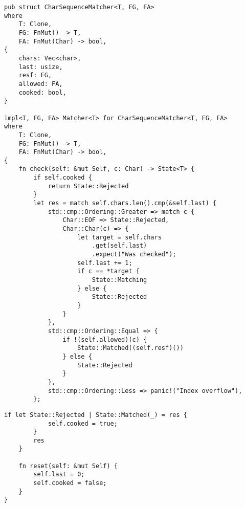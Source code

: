 \begin{lstlisting}[caption={Разбор заготовленной последовательности байт (часть 1)}, label={lst:rust_lexer_char_seq1}]
pub struct CharSequenceMatcher<T, FG, FA>
where
    T: Clone,
    FG: FnMut() -> T,
    FA: FnMut(Char) -> bool,
{
    chars: Vec<char>,
    last: usize,
    resf: FG,
    allowed: FA,
    cooked: bool,
}

impl<T, FG, FA> Matcher<T> for CharSequenceMatcher<T, FG, FA>
where
    T: Clone,
    FG: FnMut() -> T,
    FA: FnMut(Char) -> bool,
{
    fn check(self: &mut Self, c: Char) -> State<T> {
        if self.cooked {
            return State::Rejected
        }
        let res = match self.chars.len().cmp(&self.last) {
            std::cmp::Ordering::Greater => match c {
                Char::EOF => State::Rejected,
                Char::Char(c) => {
                    let target = self.chars
                        .get(self.last)
                        .expect("Was checked");
                    self.last += 1;
                    if c == *target {
                        State::Matching
                    } else {
                        State::Rejected
                    }
                }
            },
            std::cmp::Ordering::Equal => {
                if !(self.allowed)(c) {
                    State::Matched((self.resf)())
                } else {
                    State::Rejected
                }
            },
            std::cmp::Ordering::Less => panic!("Index overflow"),
        };
\end{lstlisting}
\clearpage
\begin{lstlisting}[caption={Разбор заготовленной последовательности байт (часть 2)}, label={lst:rust_lexer_char_seq2}]
        if let State::Rejected | State::Matched(_) = res {
            self.cooked = true;
        }
        res
    }

    fn reset(self: &mut Self) {
        self.last = 0;
        self.cooked = false;
    }
}
\end{lstlisting}

